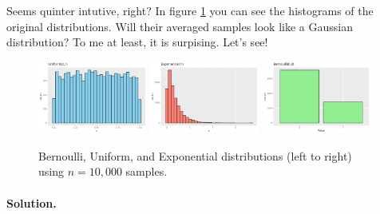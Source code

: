\documentclass[11pt]{article}
\newif\ifshowanswers
\begin{document}
\noindent
Seems quinter intutive, right? In figure \ref{fig:clt_example} you can see the histograms of the original distributions. Will their averaged samples look like a Gaussian distribution? To me at least, it is surpising. Let's see!

\begin{figure}[h]
    \centering
    \includegraphics[width=0.32\textwidth]{figures/uniform.png}
    \includegraphics[width=0.32\textwidth]{figures/exponential.png}
    \includegraphics[width=0.32\textwidth]{figures/bernoulli.png}
    \caption{Bernoulli, Uniform, and Exponential distributions (left to right) using $n=10,000$ samples.}
    \label{fig:clt_example}
\end{figure}

\ifshowanswers
  \paragraph{Solution.}
\end{document}
